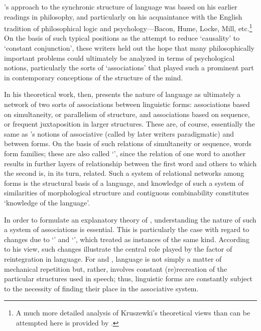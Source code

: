 {\Kruszewski}'s approach to the synchronic structure of language was
based on his earlier readings in philosophy, and particularly on his
acquaintance with the {English} tradition of philosophical logic and
psychology—Bacon, Hume, Locke, Mill, etc.\footnote{A much more
  detailed analysis of Kruszewki's theoretical views than can be
  attempted here is provided by \citet{williams93:kruszewski}.} On the
basis of such typical positions as the attempt to reduce `causality'
to `constant conjunction', these writers held out the hope that many
philosophically important problems could ultimately be analyzed in
terms of psychological notions, particularly the sorts of
`associations' that played such a prominent part in contemporary
conceptions of the structure of the mind.

In his theoretical work, then, {\Kruszewski} presents the nature of
language as ultimately a network of two sorts of associations between
linguistic forms: associations based on simultaneity, or parallelism
of structure, and associations based on sequence, or frequent
juxtaposition in larger structures. These are, of course, essentially
the same as {\Saussure}'s notions of associative (called by later writers
paradigmatic) and  between forms. On the basis of
such relations of simultaneity or sequence, words form families; these
are also called `', since the relation of one word to another
results in further layers of relationship between the first word and
others to which the second is, in its turn, related. Such a system of
relational networks among forms is the structural basis of a language,
and knowledge of such a system of similarities of morphological
structure and contiguous combinability constitutes `knowledge of the
language'.

In order to formulate an explanatory theory of ,
understanding the nature of such a system of associations is
essential. This is particularly the case with regard to changes due to
`' and `', which {\Kruszewski} treated as instances
of the same kind. According to his view, such changes illustrate the
central role played by the factor of reintegration in language. For
{\Kruszewski} and {\Baudouin}, language is not simply a matter of mechanical
repetition but, rather, involves constant (re)recreation of the
particular structures used in speech; thus, linguistic forms are
constantly subject to the necessity of finding their place in the
associative system.

